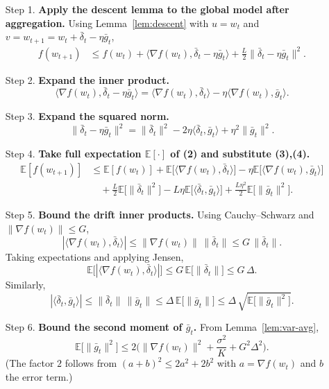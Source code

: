 \documentclass{article}
\newcommand{\E}{\mathbb{E}}
\begin{document}
\begin{enumerate}
\item[Step 1.] \textbf{Apply the descent lemma to the global model after aggregation.}
Using Lemma~\ref{lem:descent} with $u=w_t$ and $v=w_{t+1}=w_t+\bar\delta_t-\eta\bar g_t$,
\[
\begin{aligned}
f(w_{t+1})
&\le f(w_t)+\big\langle\nabla f(w_t),\bar\delta_t-\eta\bar g_t\big\rangle
      +\frac{L}{2}\big\|\bar\delta_t-\eta\bar g_t\big\|^2 .
\tag{2}
\end{aligned}
\]

\item[Step 2.] \textbf{Expand the inner product.}
\[
\big\langle\nabla f(w_t),\bar\delta_t-\eta\bar g_t\big\rangle
= \langle\nabla f(w_t),\bar\delta_t\rangle
   -\eta\langle\nabla f(w_t),\bar g_t\rangle .
\tag{3}
\]

\item[Step 3.] \textbf{Expand the squared norm.}
\[
\big\|\bar\delta_t-\eta\bar g_t\big\|^2
= \|\bar\delta_t\|^2
   -2\eta\langle\bar\delta_t,\bar g_t\rangle
   +\eta^2\|\bar g_t\|^2 .
\tag{4}
\]

\item[Step 4.] \textbf{Take full expectation $\E[\cdot]$ of (2) and substitute (3),(4).}
\[
\begin{aligned}
\E[f(w_{t+1})]
&\le \E[f(w_t)]
   +\E\!\big[\langle\nabla f(w_t),\bar\delta_t\rangle\big]
   -\eta\E\!\big[\langle\nabla f(w_t),\bar g_t\rangle\big] \\
&\quad +\frac{L}{2}\E\!\big[\|\bar\delta_t\|^2\big]
   -L\eta\E\!\big[\langle\bar\delta_t,\bar g_t\rangle\big]
   +\frac{L\eta^2}{2}\E\!\big[\|\bar g_t\|^2\big] .
\tag{5}
\end{aligned}
\]

\item[Step 5.] \textbf{Bound the drift inner products.}
Using Cauchy–Schwarz and $\|\nabla f(w_t)\|\le G$,
\[
|\langle\nabla f(w_t),\bar\delta_t\rangle|
\le \|\nabla f(w_t)\|\,\|\bar\delta_t\|
\le G\,\|\bar\delta_t\| .
\]
Taking expectations and applying Jensen,
\[
\E\!\big[|\langle\nabla f(w_t),\bar\delta_t\rangle|\big]
\le G\,\E\!\big[\|\bar\delta_t\|\big]
\le G\,\Delta .
\tag{6}
\]
Similarly,
\[
|\langle\bar\delta_t,\bar g_t\rangle|
\le \|\bar\delta_t\|\,\|\bar g_t\|
\le \Delta\,\E\!\big[\|\bar g_t\|\big]
\le \Delta\,\sqrt{\E\!\big[\|\bar g_t\|^2\big]} .
\tag{7}
\]

\item[Step 6.] \textbf{Bound the second moment of $\bar g_t$.}
From Lemma~\ref{lem:var-avg},
\[
\E\!\big[\|\bar g_t\|^2\big]
\le 2\Big(\|\nabla f(w_t)\|^2 + \frac{\sigma^2}{K}+G^2\Delta^2\Big) .
\tag{8}
\]
(The factor $2$ follows from $(a+b)^2\le2a^2+2b^2$ with $a=\nabla f(w_t)$ and
$b$ the error term.)


\end{enumerate}
\end{document}
